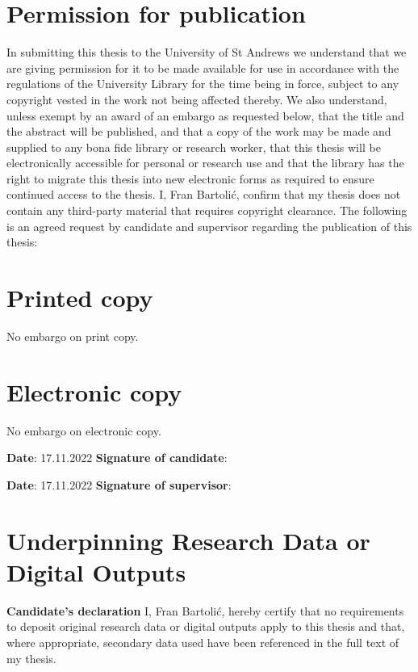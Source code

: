 \documentclass[12pt,dvipsnames]{report}
\begin{document}
\section*{Permission for publication}
In submitting this thesis to the University of St Andrews we understand that we are giving permission for it to be made available for use in accordance with the regulations of the University Library for the time being in force, subject to any copyright vested in the work not being affected thereby. We also understand, unless exempt by an award of an embargo as requested below, that the title and the abstract will be published, and that a copy of the work may be made and supplied to any bona fide library or research worker, that this thesis will be electronically accessible for personal or research use and that the library has the right to migrate this thesis into new electronic forms as required to ensure continued access to the thesis.
\newline
\newline
\noindent I, Fran Bartoli\'{c}, confirm that my thesis does not contain any third-party material that requires copyright clearance.
\newline
\newline
\noindent The following is an agreed request by candidate and supervisor regarding the publication of this thesis:
\section*{Printed copy}
No embargo on print copy.

\section*{Electronic copy}
No embargo on electronic copy.

\vspace{1cm}

\noindent \textbf{Date}: 17.11.2022 \quad\quad \textbf{Signature of candidate}: 

\vspace{1cm}

\noindent \textbf{Date}: 17.11.2022 \quad\quad \textbf{Signature of supervisor}: 

\newpage
\section*{Underpinning Research Data or Digital Outputs}
\textbf{Candidate's declaration}\newline\newline
I, Fran Bartoli\'{c}, hereby certify that no requirements to deposit original research data or digital outputs apply to this thesis and that, where appropriate, secondary data used have been referenced in the full text of my thesis.
\end{document}
